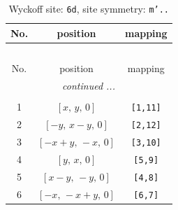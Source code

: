 \documentclass[fleqn,8pt]{jsarticle}
\begin{document}
\renewcommand{\arraystretch}{1.2}
\begin{longtable}{ccc}
\caption{Wyckoff site: {\tt 6d}, site symmetry: {\tt m'..}}
 \\
 \hline \hline
No. & position & mapping \\ \hline \endfirsthead

\multicolumn{2}{l}{\tablename\ \thetable{}} \\
 \hline \hline
No. & position & mapping \\ \hline \endhead

 \hline \hline
\multicolumn{2}{r}{\footnotesize\it continued ...} \\ \endfoot

 \hline \hline
\multicolumn{2}{r}{} \\ \endlastfoot

1 & $\left[ x,\, y,\, 0 \right]$ & {\tt [1,11]} \\ \hline
2 & $\left[ - y,\, x - y,\, 0 \right]$ & {\tt [2,12]} \\ \hline
3 & $\left[ - x + y,\, - x,\, 0 \right]$ & {\tt [3,10]} \\ \hline
4 & $\left[ y,\, x,\, 0 \right]$ & {\tt [5,9]} \\ \hline
5 & $\left[ x - y,\, - y,\, 0 \right]$ & {\tt [4,8]} \\ \hline
6 & $\left[ - x,\, - x + y,\, 0 \right]$ & {\tt [6,7]} \\
\end{longtable}
\renewcommand{\arraystretch}{1.2}
\end{document}
